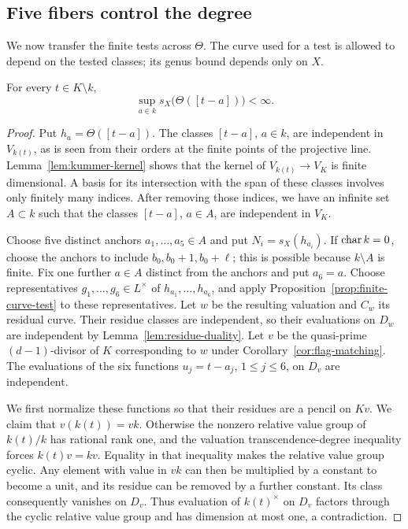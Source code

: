 \subsection{Five fibers control the degree}

We now transfer the finite tests across $\Theta$.
The curve used for a test is allowed to depend on the tested classes;
its genus bound depends only on $X$.

\begin{proposition}\label{prop:uniform-support}
For every $t\in K\setminus k$,
\[
 \sup_{a\in k}s_X\bigl(\Theta([t-a])\bigr)<\infty.
\]
\end{proposition}

\begin{proof}
Put $h_a=\Theta([t-a])$.  The classes $[t-a]$, $a\in k$, are
independent in $V_{k(t)}$, as is seen from their orders at the finite
points of the projective line.
Lemma~\ref{lem:kummer-kernel} shows that the kernel of
$V_{k(t)}\to V_K$ is finite dimensional.  A basis for its intersection
with the span of these classes involves only finitely many indices.
After removing those indices, we have an infinite set $A\subset k$
such that the classes $[t-a]$, $a\in A$, are independent in $V_K$.

Choose five distinct anchors $a_1,\ldots,a_5\in A$ and put
$N_i=s_X(h_{a_i})$.  If $\operatorname{char} k=0$, choose the anchors to include
$b_0,b_0+1,b_0+\ell$; this is possible because $k\setminus A$ is finite.
Fix one further $a\in A$ distinct from the anchors and put $a_6=a$.
Choose representatives $g_1,\ldots,g_6\in L^\times$ of
$h_{a_1},\ldots,h_{a_6}$, and apply
Proposition~\ref{prop:finite-curve-test} to these representatives.
Let $w$ be the resulting valuation and $C_w$ its residual curve.
Their residue classes are independent, so their evaluations on $D_w$
are independent by Lemma~\ref{lem:residue-duality}.
Let $v$ be the quasi-prime $(d-1)$-divisor of $K$ corresponding to $w$
under Corollary~\ref{cor:flag-matching}.
The evaluations of the six functions $u_j=t-a_j$, $1\le j\le6$,
on $D_v$ are independent.

We first normalize these functions so that their residues are a pencil
on $Kv$.  We claim that $v(k(t))=vk$.
Otherwise the nonzero relative value group of $k(t)/k$ has rational
rank one, and the valuation transcendence-degree inequality forces
$k(t)v=kv$.  Equality in that inequality makes the relative value
group cyclic.  Any element with value in $vk$ can then be multiplied
by a constant to become a unit, and its residue can be removed by a
further constant.  Its class consequently vanishes on $D_v$.
Thus evaluation of $k(t)^\times$ on $D_v$ factors through the cyclic
relative value group and has dimension at most one, a contradiction.


\end{proof}
